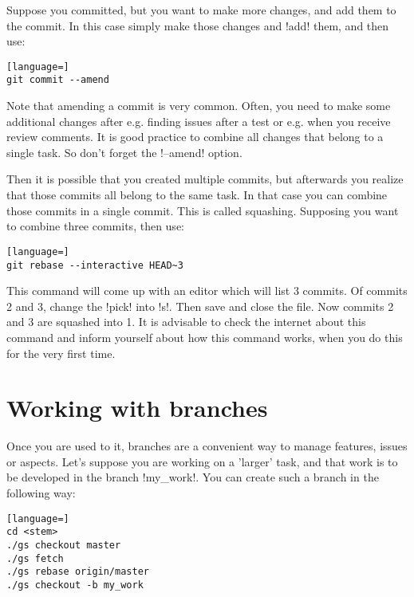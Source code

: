 \noindent
Suppose you committed, but you want to make more changes, and add them to the
commit. In this case simply make those changes and !add! them, and then use:

\begin{lstlisting}[language=]
git commit --amend
\end{lstlisting}

\noindent
Note that amending a commit is very common. Often, you need to make some
additional changes after e.g. finding issues after a test or e.g. when you
receive review comments. It is good practice to combine all changes that belong
to a single task. So don't forget the !--amend! option.

Then it is possible that you created multiple commits, but afterwards you
realize that those commits all belong to the same task. In that case you can
combine those commits in a single commit. This is called squashing. Supposing
you want to combine three commits, then use:


\begin{lstlisting}[language=]
git rebase --interactive HEAD~3
\end{lstlisting}

\noindent
This command will come up with an editor which will list 3 commits. Of commits
2 and 3, change the !pick! into !s!. Then save and close the file. Now commits
2 and 3 are squashed into 1. It is advisable to check the internet about this
command and inform yourself about how this command works, when you do this for
the very first time.

\section{Working with branches}

Once you are used to it, branches are a convenient way to manage features,
issues or aspects. Let's suppose you are working on a 'larger' task, and that
work is to be developed in the branch !my_work!. You can create such a branch
in the following way:

\begin{lstlisting}[language=]
cd <stem>
./gs checkout master
./gs fetch
./gs rebase origin/master
./gs checkout -b my_work
\end{lstlisting}


